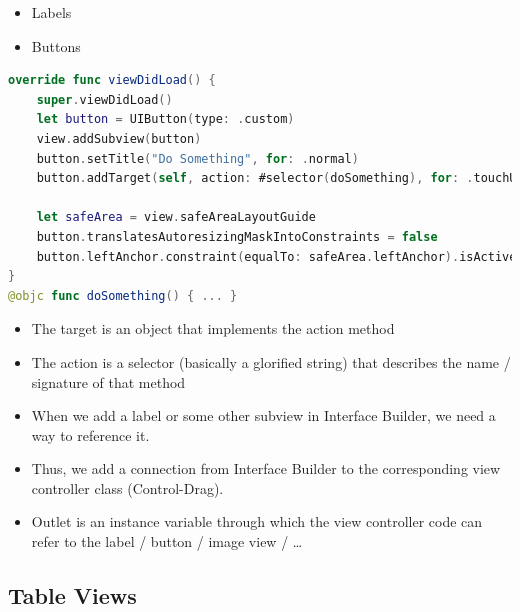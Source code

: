 \begin{breakbox}
\begin{itemize}
\tightlist
\item
  Labels
\item
  Buttons
\end{itemize}

\begin{lstlisting}[language=swift]
override func viewDidLoad() {
    super.viewDidLoad()
    let button = UIButton(type: .custom)
    view.addSubview(button)
    button.setTitle("Do Something", for: .normal)
    button.addTarget(self, action: #selector(doSomething), for: .touchUpInside)
    
    let safeArea = view.safeAreaLayoutGuide
    button.translatesAutoresizingMaskIntoConstraints = false
    button.leftAnchor.constraint(equalTo: safeArea.leftAnchor).isActive = true
}
@objc func doSomething() { ... }
\end{lstlisting}

\begin{itemize}
\tightlist
\item
  The target is an object that implements the action method
\item
  The action is a selector (basically a glorified string) that describes
  the name / signature of that method
\end{itemize}
\end{breakbox}

\begin{breakbox}
\begin{itemize}
\tightlist
\item
  When we add a label or some other subview in Interface Builder, we
  need a way to reference it.
\item
  Thus, we add a connection from Interface Builder to the corresponding
  view controller class (Control-Drag).
\item
  Outlet is an instance variable through which the view controller code
  can refer to the label / button / image view / \ldots{}
\end{itemize}
\end{breakbox}


\subsection{Table Views}


